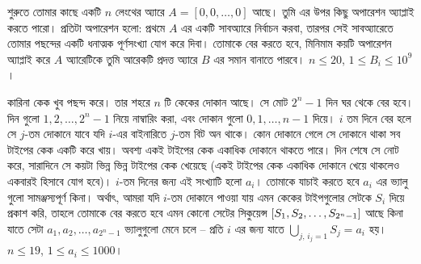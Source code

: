 \begin{example}
  শুরুতে তোমার কাছে একটি $n$ লেংথের অ্যারে $A = [0, 0, \ldots, 0]$ আছে। তুমি
  এর উপর কিছু অপারেশন অ্যাপ্লাই করতে পারো। প্রতিটা অপারেশন হলো: প্রথমে $A$ এর
  একটি সাবঅ্যারে নির্বাচন করবা, তারপর সেই সাবঅ্যারেতে তোমার পছন্দের একটি
  ধনাত্মক পূর্ণসংখ্যা যোগ করে দিবা। তোমাকে বের করতে হবে, মিনিমাম কয়টি অপারেশন
  অ্যাপ্লাই করে $A$ অ্যারেটিকে তুমি আরেকটি প্রদত্ত অ্যারে $B$ এর সমান বানাতে
  পারবে। $n \le 20$, $1 \le B_i \le 10^9$।
\end{example}

\begin{example}
  কারিনা কেক খুব পছন্দ করে। তার শহরে $n$ টি কেকের দোকান আছে। সে মোট $2^n-1$
  দিন ঘর থেকে বের হবে। দিন গুলো $1, 2, \ldots, 2^{n}-1$ নিয়ে নাম্বারিং করা,
  এবং দোকান গুলো $0, 1, \ldots, n-1$ দিয়ে। $i$ তম দিনে বের হলে সে $j$-তম
  দোকানে যাবে যদি $i$-এর বাইনারিতে $j$-তম বিট অন থাকে। কোন দোকানে গেলে সে
  দোকানে থাকা সব টাইপের কেক একটি করে খায়। অবশ্য একই টাইপের কেক একাধিক দোকানে
  থাকতে পারে। দিন শেষে সে নোট করে, সারাদিনে সে কয়টা ভিন্ন ভিন্ন টাইপের কেক
  খেয়েছে (একই টাইপের কেক একাধিক দোকানে খেয়ে থাকলেও একবারই হিসাবে যোগ হবে)।
  $i$-তম দিনের জন্য এই সংখ্যাটি হলো $a_i$। তোমাকে যাচাই করতে হবে $a_i$ এর
  ভ্যালু গুলো সামঞ্জস্যপূর্ণ কিনা। অর্থাৎ, আমরা যদি $i$-তম দোকানে পাওয়া যায়
  এমন কেকের টাইপগুলোর সেটকে $S_i$ দিয়ে প্রকাশ করি, তাহলে তোমাকে বের করতে হবে
  এমন কোনো সেটের সিকুয়েন্স $\left [ S_1, S_2, \ldots, S_{2^n-1} \right ]$ আছে কিনা যাতে
  সেটা $a_1, a_2, \ldots, a_{2^n-1}$ ভ্যালুগুলো মেনে চলে -- প্রতি $i$ এর জন্য
  যাতে $\bigcup_{j,\, i_j = 1} S_j = a_i$ হয়। $n \le 19$, $1 \le a_i \le
  1000$।
\end{example}

\begin{example}
  
\end{example}

\begin{example}
  
\end{example}

\begin{example}
  
\end{example}

